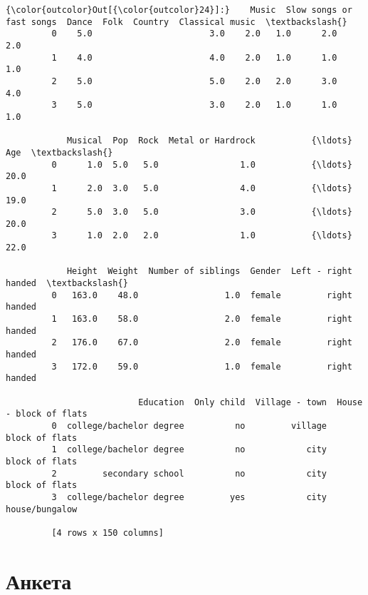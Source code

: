 \documentclass[11pt]{article}
\begin{document}
\begin{Verbatim}[commandchars=\\\{\}]
{\color{outcolor}Out[{\color{outcolor}24}]:}    Music  Slow songs or fast songs  Dance  Folk  Country  Classical music  \textbackslash{}
         0    5.0                       3.0    2.0   1.0      2.0              2.0   
         1    4.0                       4.0    2.0   1.0      1.0              1.0   
         2    5.0                       5.0    2.0   2.0      3.0              4.0   
         3    5.0                       3.0    2.0   1.0      1.0              1.0   
         
            Musical  Pop  Rock  Metal or Hardrock           {\ldots}             Age  \textbackslash{}
         0      1.0  5.0   5.0                1.0           {\ldots}            20.0   
         1      2.0  3.0   5.0                4.0           {\ldots}            19.0   
         2      5.0  3.0   5.0                3.0           {\ldots}            20.0   
         3      1.0  2.0   2.0                1.0           {\ldots}            22.0   
         
            Height  Weight  Number of siblings  Gender  Left - right handed  \textbackslash{}
         0   163.0    48.0                 1.0  female         right handed   
         1   163.0    58.0                 2.0  female         right handed   
         2   176.0    67.0                 2.0  female         right handed   
         3   172.0    59.0                 1.0  female         right handed   
         
                          Education  Only child  Village - town  House - block of flats  
         0  college/bachelor degree          no         village          block of flats  
         1  college/bachelor degree          no            city          block of flats  
         2         secondary school          no            city          block of flats  
         3  college/bachelor degree         yes            city          house/bungalow  
         
         [4 rows x 150 columns]
\end{Verbatim}
    
\pagebreak
\section{Анкета}
\end{document}
